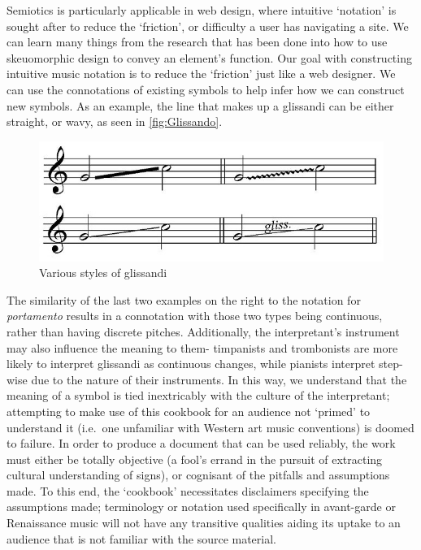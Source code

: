 Semiotics is particularly applicable in web design, where intuitive `notation' is sought after to reduce the `friction', or difficulty a user has navigating a site.
We can learn many things from the research that has been done into how to use skeuomorphic design to convey an element's function.
Our goal with constructing intuitive music notation is to reduce the `friction' just like a web designer.
We can use the connotations of existing symbols to help infer how we can construct new symbols.
As an example, the line that makes up a glissandi can be either straight, or wavy, as seen in \autoref{fig:Glissando}.
\begin{figure}
    \includegraphics[]{./resources/glissando.jpg}
\caption{Various styles of glissandi}\label{fig:Glissando}
\end{figure}
The similarity of the last two examples on the right to the notation for \emph{portamento} results in a connotation with those two types being continuous, rather than having discrete pitches.
Additionally, the interpretant's instrument may also influence the meaning to them- timpanists and trombonists are more likely to interpret glissandi as continuous changes, while pianists interpret step-wise due to the nature of their instruments.\autocite[]{need to find a citation for this}
In this way, we understand that the meaning of a symbol is tied inextricably with the culture of the interpretant; attempting to make use of this cookbook for an audience not `primed' to understand it (i.e.\ one unfamiliar with Western art music conventions) is doomed to failure.
In order to produce a document that can be used reliably, the work must either be totally objective (a fool's errand in the pursuit of extracting cultural understanding of signs), or cognisant of the pitfalls and assumptions made.
To this end, the `cookbook' necessitates disclaimers specifying the assumptions made; terminology or notation used specifically in avant-garde or Renaissance music will not have any transitive qualities aiding its uptake to an audience that is not familiar with the source material.


